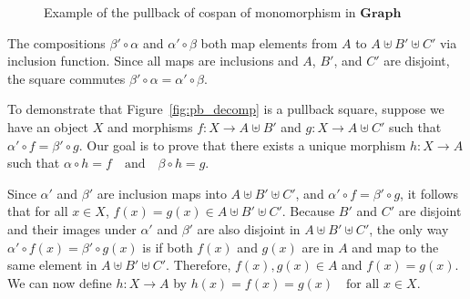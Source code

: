 \begin{example}
\begin{figure}[H]
\begin{center}
{
    }
\end{center}
\caption{Example of the pullback of cospan of monomorphism in \(\mathbf{Graph}\)}
\label{fig:ex:pb_in_graph}
\end{figure}
\end{example}

The compositions \( \beta' \circ \alpha \) and \( \alpha' \circ \beta \) both map elements from \( A \) to \( A \uplus B' \uplus C' \) via inclusion function.
Since all maps are inclusions and \( A \), \( B' \), and \( C' \) are disjoint, the square commutes $
     \beta' \circ \alpha = \alpha' \circ \beta 
$. 

To demonstrate that Figure~\ref{fig:pb_decomp} is a pullback square, suppose we have an object \( X \) and morphisms \( f: X \to A \uplus B' \) and \( g: X \to A \uplus C' \) such that
$
\alpha' \circ f = \beta' \circ g.
$
Our goal is to prove that there exists a unique morphism \( h: X \to A \) such that
$
\alpha \circ h = f \quad \text{and} \quad \beta \circ h = g.
$

Since \( \alpha' \) and \( \beta' \) are inclusion maps into \( A \uplus B' \uplus C' \), and \( \alpha' \circ f = \beta' \circ g \), it follows that for all \( x \in X \),
$
f(x) = g(x) \in A \uplus B' \uplus C'.
$
Because \( B' \) and \( C' \) are disjoint and their images under \( \alpha' \) and \( \beta' \) are also disjoint in \( A \uplus B' \uplus C' \), the only way \( \alpha' \circ f(x) = \beta' \circ g(x) \) is if both \( f(x) \) and \( g(x) \) are in \( A \) and map to the same element in \( A \uplus B' \uplus C' \).
Therefore, \( f(x), g(x) \in A \) and \( f(x) = g(x) \).
We can now define \( h: X \to A \) by
$
h(x) = f(x) = g(x) \quad \text{for all } x \in X.
$


